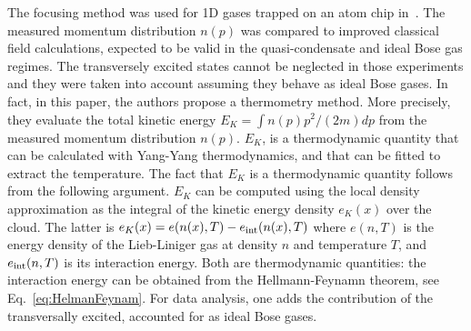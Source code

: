 \documentclass[onecolumn,amsfonts,showpacs,superscriptaddress]{revtex4-1}
\newcommand{\comJ}[1]{{\color{orange}#1}}
\begin{document}
The focusing method was used for 1D gases trapped on an atom chip in~\citep{davis_yang-yang_2012}. The measured momentum distribution $n(p)$ was compared to 
improved classical field calculations, expected to be valid in the quasi-condensate and ideal Bose gas regimes. The transversely excited states cannot be neglected in those experiments and 
they were taken into account assuming they behave as ideal Bose gases.
In fact, in this paper, the authors propose a thermometry method. More precisely, they evaluate the
total kinetic energy $E_K=\int  n(p) p^2/(2m) dp$
from 
the measured momentum distribution $n(p)$.  $E_K$, is  a thermodynamic quantity that can be calculated with  Yang-Yang thermodynamics, and that can be fitted to extract the temperature. 
The fact that $E_K$ is a thermodynamic quantity 
follows from the following argument. 
$E_K$ can be computed using the local density approximation as the integral of the 
kinetic energy density $e_K(x)$ over the cloud. The latter is 
$e_K(x)=e(n(x),T) - e_{\rm int}(n(x),T)$
where $e(n,T)$ is the energy density of the Lieb-Liniger gas at density $n$ and temperature $T$, and $e_{\rm int}(n,T)$ is its interaction energy. 
Both are thermodynamic quantities: the interaction energy can be obtained from the Hellmann-Feynamn theorem, see Eq.~\eqref{eq:HelmanFeynam}. For data analysis, one adds the contribution of the transversally excited,  accounted for as ideal Bose gases.

\end{document}
